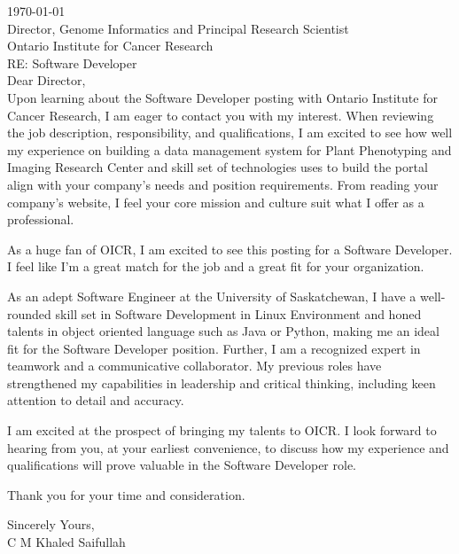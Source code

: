 \documentclass[10pt,a4paper,ragged2e,withhyper]{altacv}
\begin{document}

\makecvheader

\hfill \break
\hfill \break

\today\\
\hfill \break
Director, Genome Informatics and Principal Research Scientist\\
Ontario Institute for Cancer Research\\
\hfil \break
RE: Software Developer\\
\hfil \break
Dear Director,\\
\hfill\break
Upon learning about the Software Developer posting with Ontario Institute for Cancer Research, I am eager to contact you with my interest. When reviewing the job description, responsibility, and qualifications, I am excited to see how well my experience on building a data management system for Plant Phenotyping and Imaging Research Center and skill set of technologies uses to build the portal align with your company's needs and position requirements. From reading your company's website, I feel your core mission and culture suit what I offer as a professional.\\
\hfill \break

As a huge fan of OICR, I am excited to see this posting for a Software Developer. I feel like I'm a great match for the job and a great fit for your organization.\\
\hfill \break

As an adept Software Engineer at the University of Saskatchewan, I have a well-rounded skill set in Software Development in Linux Environment and honed talents in object oriented language such as Java or Python, making me an ideal fit for the Software Developer position. Further, I am a recognized expert in teamwork and a communicative collaborator. My previous roles have strengthened my capabilities in leadership and critical thinking, including keen attention to detail and accuracy.\\
\hfill \break

I am excited at the prospect of bringing my talents to OICR. I look forward to hearing from you, at your earliest convenience, to discuss how my experience and qualifications will prove valuable in the Software Developer role. \\
\hfill \break

Thank you for your time and consideration.\\
\hfill \break

\hfill \break
\hfill \break
Sincerely Yours,\\
C M Khaled Saifullah
\end{document}

